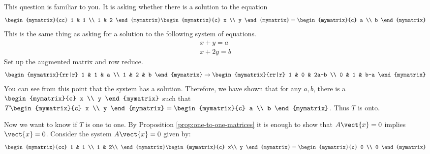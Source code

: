 \begin{solution}
This question is familiar to you. It is asking whether
there is a solution to the equation
\begin{equation*}
\begin{mymatrix}{cc}
1 & 1 \\
1 & 2
\end{mymatrix} \begin{mymatrix}{c}
x \\
y
\end{mymatrix} =\begin{mymatrix}{c}
a \\
b
\end{mymatrix}
\end{equation*}
This is the same thing as asking for a solution to the following system of
equations.
\begin{equation*}
\begin{array}{c}
x+y=a \\
x+2y=b
\end{array}
\end{equation*}
Set up the augmented matrix and row reduce.
\begin{equation}
\begin{mymatrix}{rr|r}
1 & 1 & a \\
1 & 2 & b
\end{mymatrix} \rightarrow \begin{mymatrix}{rr|r}
1 & 0 & 2a-b \\
0 & 1 & b-a
\end{mymatrix}
\label{onto-matrix}
\end{equation}
You can see from this point that the system has a solution. Therefore,
we have shown that for any $a, b$, there is a $
\begin{mymatrix}{c}
x \\
y
\end{mymatrix}$ such that $T\begin{mymatrix}{c}
x \\
y
\end{mymatrix} =\begin{mymatrix}{c}
a \\
b
\end{mymatrix}$.
Thus $T$ is onto.

Now we want to know if $T$ is one to one. 
By Proposition \ref{prop:one-to-one-matrices} it is enough to show that $A\vect{x}=0$ implies $\vect{x}=0$. 
Consider the system $A\vect{x}=0$ given by:
\begin{equation*}
\begin{mymatrix}{cc}
1 & 1 \\
1 & 2\\
\end{mymatrix}
\begin{mymatrix}{c}
x\\
y
\end{mymatrix}
=
\begin{mymatrix}{c}
0 \\
0
\end{mymatrix}
\end{equation*}


\end{solution}
